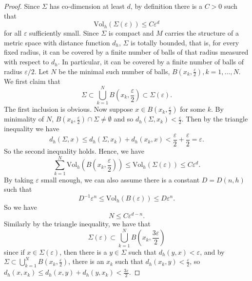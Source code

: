 \documentclass[12pt]{amsart}
\theoremstyle{plain}
\theoremstyle{plain}
\theoremstyle{definition}
\theoremstyle{remark}
\numberwithin{equation}{subsection}
\begin{document}
\begin{proof}
    Since $\Sigma$ has co-dimension at least $d$, by definition there is a $C > 0$ such that
    \begin{equation*}
        \text{Vol}_h(\Sigma(\varepsilon)) \leq C\varepsilon^d
    \end{equation*}
    for  all $\varepsilon$ sufficiently small. Since $\Sigma$ is compact and $M$ carries the structure of a metric space with distance function $d_h$, $\Sigma$ is totally bounded, that is, for every fixed radius, it can be covered by a finite number of balls of that radius measured with respect to $d_h$. In particular, it can be covered by a finite number of balls of radius $\varepsilon/2$. Let $N$ be the minimal such number of balls, $B(x_k, \frac{\varepsilon}{2}), k = 1,\dots,N$. We first claim that
    \begin{equation*}
        \Sigma \subset \bigcup\limits_{k=1}^N B\left(x_k,\frac{\varepsilon}{2}\right) \subset \Sigma(\varepsilon).
    \end{equation*}
    The first inclusion is obvious. Now suppose $x \in B(x_k,\frac{\varepsilon}{2})$ for some $k$. By minimality of $N$, $B(x_k,\frac{\varepsilon}{2})\cap\Sigma \neq \emptyset$ and so $d_h(\Sigma,x_k) < \frac{\varepsilon}{2}$. Then by the triangle inequality we have
    \begin{equation*}
        d_h(\Sigma, x) \leq d_h(\Sigma, x_k) + d_h(x_k, x) < \frac{\varepsilon}{2} + \frac{\varepsilon}{2} = \varepsilon.
    \end{equation*}
    So the second inequality holds. Hence, we have
    \begin{equation*}
        \sum_{k=1}^N\text{Vol}_h\left(B\left(x_k,\frac{\varepsilon}{2}\right)\right) \leq \text{Vol}_h(\Sigma(\varepsilon)) \leq C\varepsilon^d.
    \end{equation*}
    By taking $\varepsilon$ small enough, we can also assume there is a constant $D=D(n,h)$ such that
    \begin{equation*}
        D^{-1}\varepsilon^n \leq \text{Vol}_h(B(\varepsilon)) \leq D\varepsilon^n.
    \end{equation*}
    So we have
    \begin{equation}\label{eqn:distributional-scalar-curvature-N-estimate}
        N \leq C\varepsilon^{d-n}.
    \end{equation}
    Similarly by the triangle inequality, we have that
    \begin{equation*}
        \Sigma(\varepsilon) \subset \bigcup\limits_{k=1}^N B\left(x_k,\frac{3\varepsilon}{2}\right)
    \end{equation*}
    since if $x \in \Sigma(\varepsilon)$, then there is a $y \in \Sigma$ such that $d_h(y,x) < \varepsilon$, and by $\Sigma \subset \bigcup\limits_{k=1}^N B\left(x_k,\frac{\varepsilon}{2}\right)$, there is an $x_k$ such that $d_h(x_k, y) < \frac{\varepsilon}{2}$, so $d_h(x,x_k) \leq d_h(x,y) + d_h(y,x_k) < \frac{3\varepsilon}{2}$.


\end{proof}
\end{document}
